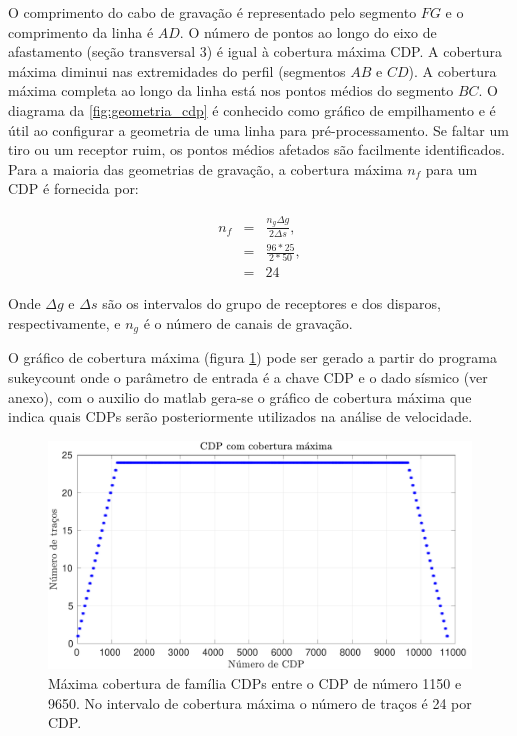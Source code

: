 O comprimento do cabo de gravação é representado pelo segmento $FG$ e o comprimento da linha é $AD$. O número de pontos ao longo do eixo de afastamento (seção transversal 3) é igual à cobertura máxima CDP. A cobertura máxima diminui nas extremidades do perfil (segmentos $AB$
e $CD$). A cobertura máxima completa ao longo da linha está nos pontos médios do segmento $BC$. O diagrama da \ref{fig:geometria_cdp} é conhecido como gráfico de empilhamento e é útil ao configurar a geometria de uma linha para pré-processamento. Se faltar um tiro ou um receptor ruim, os pontos médios afetados são facilmente identificados. Para a maioria das geometrias de gravação, a cobertura máxima $n_f$ para um CDP é fornecida por:

\begin{eqnarray}
n_{f}&=&\frac{n_{g}\Delta g}{2\Delta s},\\
\nonumber &=&\frac{96*25}{2*50},\\ 
\nonumber &=& 24
\label{eq:cobertura_max}
\end{eqnarray}

Onde $\Delta g$ e $\Delta s$ são os intervalos do grupo de receptores e dos disparos, respectivamente, e $n_g$ é o número de canais de gravação.

O gráfico de cobertura máxima (figura \ref{fig:CDPiluminados}) pode ser gerado a partir do programa sukeycount onde o parâmetro de entrada é a chave CDP e o dado sísmico (ver anexo), com o auxilio do matlab gera-se o gráfico de cobertura máxima que indica quais CDPs serão posteriormente utilizados na análise de velocidade.

\begin{figure}[H]
\centering
\includegraphics[width=16cm]{figuras/cap2/CDP_iluminados.pdf}
\caption{Máxima cobertura de família CDPs entre o CDP de número 1150 e 9650. No intervalo de cobertura máxima o número de traços é 24 por CDP.}
\label{fig:CDPiluminados}
\end{figure}

